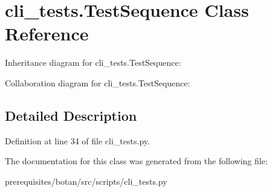 \hypertarget{classcli__tests_1_1_test_sequence}{}\section{cli\+\_\+tests.\+Test\+Sequence Class Reference}
\label{classcli__tests_1_1_test_sequence}


Inheritance diagram for cli\+\_\+tests.\+Test\+Sequence\+:


Collaboration diagram for cli\+\_\+tests.\+Test\+Sequence\+:


\subsection{Detailed Description}


Definition at line 34 of file cli\+\_\+tests.\+py.



The documentation for this class was generated from the following file\+:\begin{DoxyCompactItemize}
\item 
prerequisites/botan/src/scripts/cli\+\_\+tests.\+py\end{DoxyCompactItemize}
